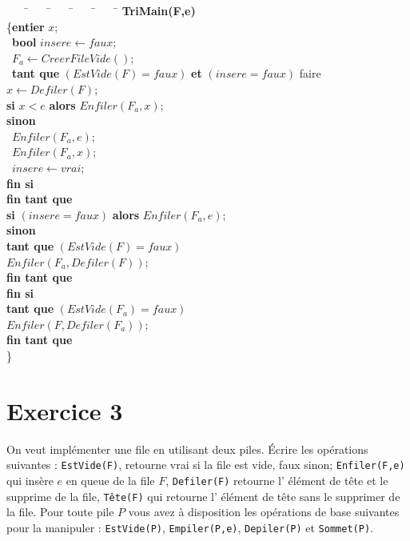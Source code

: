 \documentclass[10pt,a4paper]{article}
\begin{document}
\begin{itemize}
\begin{tcolorbox} 
\begin{tabbing}
	~~~~\=~~~~\=~~~~\=~~~~\=~~~~\=\kill
	\>  \textbf{TriMain(F,e)}\\
	 \> \{\textbf{entier} $x$;\\
	 \> \ \textbf{bool} $insere\leftarrow faux$;\\
        \> \ $F_{a} \leftarrow CreerFileVide()$;\\
         \> \ \textbf{tant que} $(EstVide(F)=faux)$ \textbf{et} $(insere=faux)$ faire\\
           \> \> $x\leftarrow Defiler(F)$;\\
          \> \> \textbf{si} $x<e$ \textbf{alors} $Enfiler(F_{a},x)$;\\
         \> \> \textbf{sinon} \\
           \> \> \ $Enfiler(F_{a},e)$; \\
           \> \> \ $Enfiler(F_{a},x)$;\\
           \> \> \ $insere\leftarrow vrai$;\\
           \> \> \textbf{fin si}\\ 
 \> \textbf{fin tant que} \\
          \> \textbf{si} $(insere=faux)$ \textbf{alors} $Enfiler(F_{a},e)$;\\   %
          \> \textbf{sinon} \\
           \> \> \textbf{tant que} $(EstVide(F)=faux)$\\ %
         \> \> $Enfiler(F_{a},Defiler(F))$;\\
        \> \> \textbf{fin tant que}\\
\> \textbf{fin si}\\ 
 \> \textbf{tant que} $(EstVide(F_{a})=faux)$ \\
         \> $Enfiler(F,Defiler(F_{a}))$;\\
        \> \textbf{fin tant que}\\
        \> \} 
\end{tabbing}
\end{tcolorbox}


\end{itemize}

\section*{Exercice 3}
On veut implémenter une file en utilisant deux piles. Écrire les opérations suivantes : \texttt{EstVide(F)}, 
retourne vrai si la file est vide, faux sinon; \texttt{Enfiler(F,e)} qui insère $e$ en queue de la file $F$, \texttt{Defiler(F)}
retourne l’ élément de tête et le supprime de la file, \texttt{Tête(F)} qui retourne l’ élément de tête sans le supprimer de la file.
Pour toute pile $P$ vous avez à disposition les opérations de base suivantes pour la manipuler : \texttt{EstVide(P)},  \texttt{Empiler(P,e)}, \texttt{Depiler(P)} et \texttt{Sommet(P)}.
\end{document}
